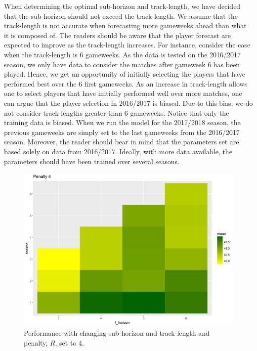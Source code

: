 \newpar

When determining the optimal sub-horizon and track-length, we have decided that the sub-horizon should not exceed the track-length. We assume that the track-length is not accurate when forecasting more gameweeks ahead than what it is composed of. The readers should be aware that the player forecast are expected to improve as the track-length increases. For instance, consider the case when the track-length is 6 gameweeks. As the data is tested on the 2016/2017 season, we only have data to consider the matches after gameweek 6 has been played. Hence, we get an opportunity of initially selecting the players that have performed best over the 6 first gameweeks. As an increase in track-length allows one to select players that have initially performed well over more matches, one can argue that the player selection in 2016/2017 is biased. Due to this bias, we do not consider track-lengths greater than 6 gameweeks. Notice that only the training data is biased. When we run the model for the 2017/2018 season, the previous gameweeks are simply set to the last gameweeks from the 2016/2017 season. Moreover, the reader should bear in mind that the parameters set are based solely on data from 2016/2017. Ideally, with more data available, the parameters should have been trained over several seasons.



\begin{figure}[H]
    \centering
    \includegraphics[scale=0.5]{fig/chapter_6/pen_4.png}
    \caption{Performance with changing sub-horizon and track-length and penalty, $R$, set to 4.}
\label{fig:pen_4}    
\end{figure}


